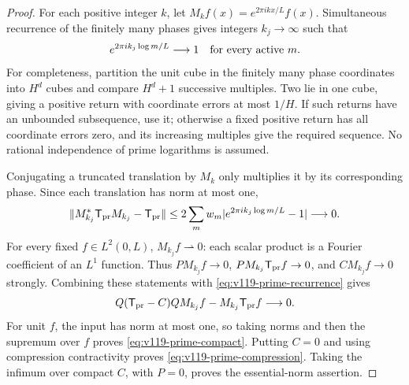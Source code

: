 \begin{proof}
For each positive integer $k$, let
$M_k f(x)=e^{2\pi ikx/L}f(x)$.  Simultaneous recurrence of the finitely
many phases gives integers $k_j\to\infty$ such that
\[
 e^{2\pi ik_j\log m/L}\longrightarrow1
 \quad\hbox{for every active }m.
\]
For completeness, partition the unit cube in the finitely many phase
coordinates into $H^d$ cubes and compare $H^d+1$ successive multiples.
Two lie in one cube, giving a positive return with coordinate errors
at most $1/H$.  If such returns have an unbounded subsequence, use it;
otherwise a fixed positive return has all coordinate errors zero,
and its increasing multiples give the required sequence.  No rational
independence of prime logarithms is assumed.

Conjugating a truncated translation by $M_k$ only multiplies it by
its corresponding phase.  Since each translation has norm at most one,
\begin{equation}\label{eq:v119-prime-recurrence}
 \|M_{k_j}^*\mathsf T_{\rm pr}M_{k_j}-\mathsf T_{\rm pr}\|
 \le2\sum_m w_m|e^{2\pi ik_j\log m/L}-1|\longrightarrow0.
\end{equation}
For every fixed $f\in L^2(0,L)$, $M_{k_j}f\rightharpoonup0$:
each scalar product is a Fourier coefficient of an $L^1$ function.
Thus $PM_{k_j}f\to0$, $PM_{k_j}\mathsf T_{\rm pr}f\to0$, and
$CM_{k_j}f\to0$ strongly.  Combining these statements with
\eqref{eq:v119-prime-recurrence} gives
\[
 Q(\mathsf T_{\rm pr}-C)Q M_{k_j}f
       -M_{k_j}\mathsf T_{\rm pr}f\longrightarrow0.
\]
For unit $f$, the input has norm at most one, so taking norms and then
the supremum over $f$ proves \eqref{eq:v119-prime-compact}.
Putting $C=0$ and using compression contractivity proves
\eqref{eq:v119-prime-compression}.  Taking the infimum over compact
$C$, with $P=0$, proves the essential-norm assertion.
\end{proof}

